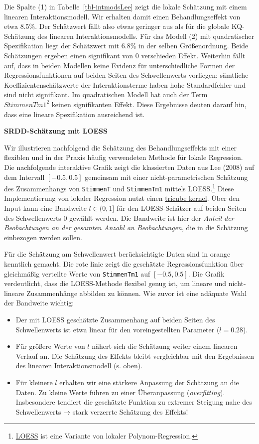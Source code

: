 \documentclass[
  a4paper,
  DIV=11,
  oneside]{scrreprt}
\begin{document}
Die Spalte (1) in Tabelle~\ref{tbl-intmodsLee} zeigt die lokale
Schätzung mit einem linearen Interaktionsmodell. Wir erhalten damit
einen Behandlungseffekt von etwa \(8.5\%\). Der Schätzwert fällt also
etwas geringer aus als für die globale KQ-Schätzung des linearen
Interaktionsmodells. Für das Modell (2) mit quadratischer Spezifikation
liegt der Schätzwert mit \(6.8\%\) in der selben Größenordnung. Beide
Schätzungen ergeben einen signifikant von \(0\) verschieden Effekt.
Weiterhin fällt auf, dass in beiden Modellen keine Evidenz für
unterschiedliche Formen der Regressionsfunktionen auf beiden Seiten des
Schwellenwerts vorliegen: sämtliche Koeffizientenschätzwerte der
Interaktionsterme haben hohe Standardfehler und sind nicht signifikant.
Im quadratischen Modell hat auch der Term \(StimmenTm1^2\) keinen
signifikanten Effekt. Diese Ergebnisse deuten darauf hin, dass eine
lineare Spezifikation ausreichend ist.

\textbf{SRDD-Schätzung mit LOESS}

Wir illustrieren nachfolgend die Schätzung des Behandlungseffekts mit
einer flexiblen und in der Praxis häufig verwendeten Methode für lokale
Regression. Die nachfolgende interaktive Grafik zeigt die klassierten
Daten aus Lee (2008) auf dem Intervall \([-0.5,0.5]\) gemeinsam mit
einer nicht-parametrischen Schätzung des Zusammenhangs von
\texttt{StimmenT} und \texttt{StimmenTm1} mittels LOESS.\footnote{\href{https://en.wikipedia.org/wiki/Local_regression}{LOESS}
  ist eine Variante von lokaler Polynom-Regression.} Diese
Implementierung von lokaler Regression nutzt einen
\href{https://en.wikipedia.org/wiki/Kernel_(statistics)}{tricube
kernel}. Über den Input kann eine Bandweite \(l\in(0,1]\) für den
LOESS-Schätzer auf beiden Seiten des Schwellenwerts \(0\) gewählt
werden. Die Bandweite ist hier der \emph{Anteil der Beobachtungen an der
gesamten Anzahl an Beobachtungen}, die in die Schätzung einbezogen
werden sollen.

Für die Schätzung am Schwellenwert berücksichtigte Daten sind in orange
kenntlich gemacht. Die rote linie zeigt die geschätzte
Regressionsfunktion über gleichmäßig verteilte Werte von
\texttt{StimmenTm1} auf \([-0.5,0.5]\). Die Grafik verdeutlicht, dass
die LOESS-Methode flexibel genug ist, um lineare und nicht-lineare
Zusammenhänge abbilden zu können. Wie zuvor ist eine adäquate Wahl der
Bandweite wichtig:

\begin{itemize}
\item
  Der mit LOESS geschätzte Zusammenhang auf beiden Seiten des
  Schwellenwerts ist etwa linear für den voreingestellten Parameter
  (\(l = 0.28\)).
\item
  Für größere Werte von \(l\) nähert sich die Schätzung weiter einem
  linearen Verlauf an. Die Schätzung des Effekts bleibt vergleichbar mit
  den Ergebnissen des linearen Interaktionsmodell (s. oben).
\item
  Für kleinere \(l\) erhalten wir eine stärkere Anpassung der Schätzung
  an die Daten. Zu kleine Werte führen zu einer Überanpassung
  (\emph{overfitting}). Insbesondere tendiert die geschätzte Funktion zu
  extremer Steigung nahe des Schwellenwerts → stark verzerrte Schätzung
  des Effekts!
\end{itemize}
\end{document}
